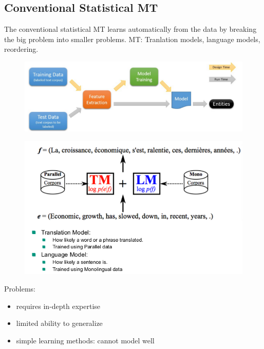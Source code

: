 \subsection{Conventional Statistical MT}
\label{ssect:conventional-statistical-mt}
The conventional statistical MT learns automatically from the data by breaking the big problem into smaller problems. MT: Tranlation models, language models, reordering.
\begin{figure}[h]
\includegraphics[scale=0.6]{conventional-statistical-MT}
\end{figure}
\begin{figure}[h]
\includegraphics[scale=0.4]{statistical-mt}
\end{figure}
Problems:
\begin{itemize}
	\item requires in-depth expertise
	\item limited ability to generalize
	\item simple learning methods: cannot model well
\end{itemize}

